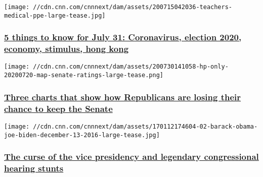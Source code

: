 \href{/2020/07/31/us/five-things-july-31-trnd/index.html}{}

\texttt{[image: //cdn.cnn.com/cnnnext/dam/assets/200715042036-teachers-medical-ppe-large-tease.jpg]}

\hypertarget{5-things-to-know-for-july-31-coronavirus-election-2020-economy-stimulus-hong-kong}{%
\subsubsection{\texorpdfstring{\href{/2020/07/31/us/five-things-july-31-trnd/index.html}{5
things to know for July 31: Coronavirus, election 2020, economy,
stimulus, hong
kong}}{5 things to know for July 31: Coronavirus, election 2020, economy, stimulus, hong kong}}\label{5-things-to-know-for-july-31-coronavirus-election-2020-economy-stimulus-hong-kong}}

\href{/2020/07/31/politics/senate-map-republicans/index.html}{}

\texttt{[image: //cdn.cnn.com/cnnnext/dam/assets/200730141058-hp-only-20200720-map-senate-ratings-large-tease.png]}

\hypertarget{three-charts-that-show-how-republicans-are-losing-their-chance-to-keep-the-senate}{%
\subsubsection{\texorpdfstring{\href{/2020/07/31/politics/senate-map-republicans/index.html}{Three
charts that show how Republicans are losing their chance to keep the
Senate}}{Three charts that show how Republicans are losing their chance to keep the Senate}}\label{three-charts-that-show-how-republicans-are-losing-their-chance-to-keep-the-senate}}

\href{/2020/07/31/world/meanwhile-in-america-july-30-intl/index.html}{}

\texttt{[image: //cdn.cnn.com/cnnnext/dam/assets/170112174604-02-barack-obama-joe-biden-december-13-2016-large-tease.jpg]}

\hypertarget{the-curse-of-the-vice-presidency-and-legendary-congressional-hearing-stunts}{%
\subsubsection{\texorpdfstring{\href{/2020/07/31/world/meanwhile-in-america-july-30-intl/index.html}{The
curse of the vice presidency and legendary congressional hearing
stunts}}{The curse of the vice presidency and legendary congressional hearing stunts}}\label{the-curse-of-the-vice-presidency-and-legendary-congressional-hearing-stunts}}

